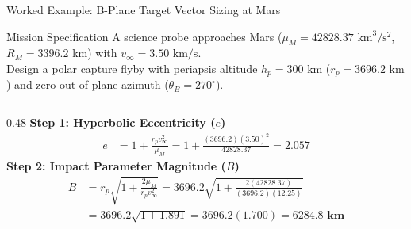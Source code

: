 \documentclass[aspectratio=169, 10pt]{beamer}
\begin{document}
\begin{frame}{Worked Example: B-Plane Target Vector Sizing at Mars}
    \begin{exampleblock}{Mission Specification}
        \scriptsize
        A science probe approaches Mars ($\mu_M = 42828.37\text{ km}^3/\text{s}^2$, $R_M = 3396.2\text{ km}$) with $v_\infty = 3.50\text{ km/s}$. \\
        Design a polar capture flyby with periapsis altitude $h_p = 300\text{ km}$ ($r_p = 3696.2\text{ km}$) and zero out-of-plane azimuth ($\theta_B = 270^\circ$).
    \end{exampleblock}

    \vspace{-0.15cm}

    \begin{columns}[t]
        \begin{column}{0.48\textwidth}
            \scriptsize
            \textbf{Step 1: Hyperbolic Eccentricity ($e$)}
            \begin{align*}
                e &= 1 + \frac{r_p v_\infty^2}{\mu_M} = 1 + \frac{(3696.2)(3.50)^2}{42828.37} = \mathbf{2.057}
            \end{align*}
            \textbf{Step 2: Impact Parameter Magnitude ($B$)}
            \begin{align*}
                B &= r_p \sqrt{1 + \frac{2\mu_M}{r_p v_\infty^2}} = 3696.2 \sqrt{1 + \frac{2(42828.37)}{(3696.2)(12.25)}} \\
                &= 3696.2 \sqrt{1 + 1.891} = 3696.2(1.700) = \mathbf{6284.8\text{ km}}
            \end{align*}
        \end{column}


\end{columns}
\end{frame}
\end{document}
